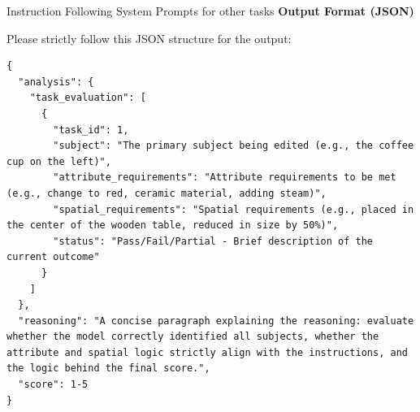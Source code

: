 \begin{promptbox}[label={System Prompts: IF_other tasks}]{Instruction Following System Prompts for other tasks}
\textbf{Output Format (JSON)}

Please strictly follow this JSON structure for the output:

\begin{lstlisting}
{
  "analysis": {
    "task_evaluation": [
      {
        "task_id": 1,
        "subject": "The primary subject being edited (e.g., the coffee cup on the left)",
        "attribute_requirements": "Attribute requirements to be met (e.g., change to red, ceramic material, adding steam)",
        "spatial_requirements": "Spatial requirements (e.g., placed in the center of the wooden table, reduced in size by 50%)",
        "status": "Pass/Fail/Partial - Brief description of the current outcome"
      }
    ]
  },
  "reasoning": "A concise paragraph explaining the reasoning: evaluate whether the model correctly identified all subjects, whether the attribute and spatial logic strictly align with the instructions, and the logic behind the final score.",
  "score": 1-5
}
\end{lstlisting}

\end{promptbox}

\clearpage

